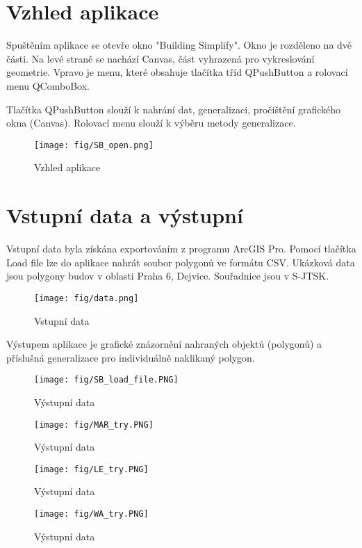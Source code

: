 \documentclass[oneside,12pt,a4paper]{book}
\begin{document}
\chapter{Vzhled aplikace}
Spuštěním aplikace se otevře okno "Building Simplify". Okno je rozděleno na dvě části. Na levé straně se nachází Canvas, část vyhrazená pro vykreslování geometrie. Vpravo je menu, které obsahuje tlačítka tříd QPushButton a rolovací menu QComboBox.\par
Tlačítka QPushButton slouží k nahrání dat, generalizaci, pročištění grafického okna (Canvas). Rolovací menu slouží k výběru metody generalizace.

\begin{figure}[ht!]
    \centering
    \texttt{[image: fig/SB\_open.png]}
    \caption{Vzhled aplikace}
    \label{fig:Zadání úlohy}
\end{figure}

\bigskip

\chapter{Vstupní data a výstupní} 
Vstupní data byla získána exportováním z programu ArcGIS Pro.
Pomocí tlačítka Load file lze do aplikace nahrát soubor polygonů ve formátu CSV. Ukázková data jsou polygony budov v oblasti Praha 6, Dejvice. Souřadnice jsou v S-JTSK. \par

\begin{figure}[ht!]
    \centering
    \texttt{[image: fig/data.png]}
    \caption{Vstupní data}
    \label{fig:Zadání úlohy}
\end{figure}


Výstupem aplikace je grafické znázornění nahraných objektů (polygonů) a příslušná generalizace pro individuálně naklikaný polygon.

\begin{figure}[ht!]
    \centering
    \texttt{[image: fig/SB\_load\_file.PNG]}
    \caption{Výstupní data}
    \label{fig:Výstupní data - nahrání souboru}
\end{figure}
\begin{figure}[ht!]
    \centering
    \texttt{[image: fig/MAR\_try.PNG]}
    \caption{Výstupní data}
    \label{fig:Výstupní data - Minimum Area Rectangle}
\end{figure}
\begin{figure}[ht!]
    \centering
    \texttt{[image: fig/LE\_try.PNG]}
    \caption{Výstupní data}
    \label{fig:Výstupní data - Longest Edge}
\end{figure}
\begin{figure}[ht!]
    \centering
    \texttt{[image: fig/WA\_try.PNG]}
    \caption{Výstupní data}
    \label{fig:Výstupní data - Wall Average}
\end{figure}
\end{document}

